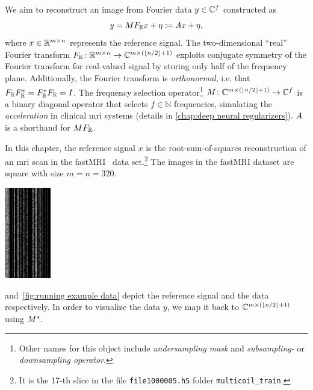 We aim to reconstruct an image from Fourier data \( y \in \mathbb{C}^{f} \) constructed as
\begin{equation}
	y = M F_{\mathbb{R}}x + \eta \coloneqq Ax + \eta,
\end{equation}
where \( x \in \mathbb{R}^{m \times n} \) represents the reference signal.
The two-dimensional \enquote{real} Fourier transform \( F_{\mathbb{R}} \colon \mathbb{R}^{m \times n} \to \mathbb{C}^{m \times (\lfloor n / \num{2} \rfloor + \num{1})} \) exploits conjugate symmetry of the Fourier transform for real-valued signal by storing only half of the frequency plane.
Additionally, the Fourier transform is \emph{orthonormal}, i.e. that \( F_{\mathbb{R}}F_{\mathbb{R}}^{\ast} = F_{\mathbb{R}}^{\ast}F_{\mathbb{R}} = I \).
The frequency selection operator\footnote{
	Other names for this object include \emph{undersampling mask} and \emph{subsampling-} or \emph{downsampling operator}.
} \( M \colon \mathbb{C}^{m \times (\lfloor n / \num{2} \rfloor + \num{1})} \to \mathbb{C}^{f} \) is a binary diagonal operator that selects \( f \in \mathbb{N} \) frequencies, simulating the \emph{acceleration} in clinical \gls{mri} systems (details in \cref{chap:deep neural regularizers}).
\( A \) is a shorthand for \( MF_{\mathbb{R}} \).

In this chapter, the reference signal \( x \) is the root-sum-of-squares reconstruction of an \gls{mri} scan in the fastMRI~\cite{zbontar_fastmri_2018} data set.\footnote{%
	It is the \num{17}-th slice in the file \texttt{file1000005.h5} folder \texttt{multicoil\_train}.%
}
The images in the fastMRI dataset are square with size \( m = n = \num{320} \).
\begin{sidefigure}
	\centering
	\includegraphics[width=2cm]{log-abs-data}
	\caption[Running example: Zero-filled data]{%
		The logarithm of the absolute value of the zero filled data \( \Adjoint{\Mask}\Data \).
	}%
	\label{fig:running example data}
\end{sidefigure}
 and~\cref{fig:running example data} depict the reference signal and the data respectively.
In order to visualize the data \( y \), we map it back to \( \mathbb{C}^{m \times (\lfloor n / \num{2} \rfloor + \num{1})} \) using \( M^{\ast} \).

